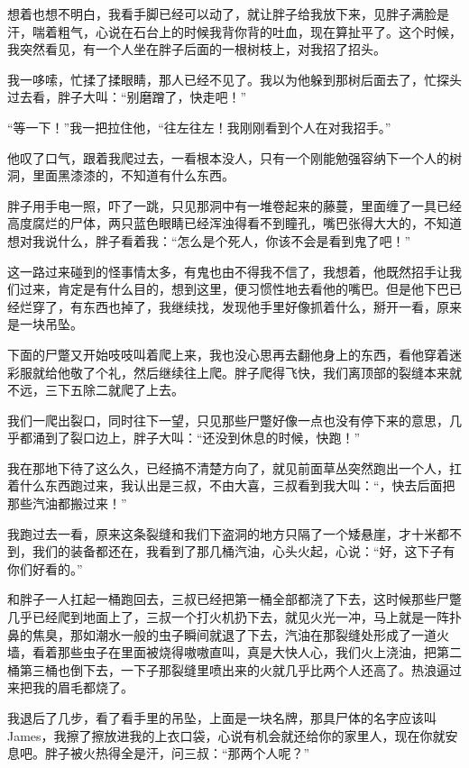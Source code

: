 想着也想不明白，我看手脚已经可以动了，就让胖子给我放下来，见胖子满脸是汗，喘着粗气，心说在石台上的时候我背你背的吐血，现在算扯平了。这个时候，我突然看见，有一个人坐在胖子后面的一根树枝上，对我招了招头。

我一哆嗦，忙揉了揉眼睛，那人已经不见了。我以为他躲到那树后面去了，忙探头过去看，胖子大叫：“别磨蹭了，快走吧！”

“等一下！”我一把拉住他，“往左往左！我刚刚看到个人在对我招手。”

他叹了口气，跟着我爬过去，一看根本没人，只有一个刚能勉强容纳下一个人的树洞，里面黑漆漆的，不知道有什么东西。

胖子用手电一照，吓了一跳，只见那洞中有一堆卷起来的藤蔓，里面缠了一具已经高度腐烂的尸体，两只蓝色眼睛已经浑浊得看不到瞳孔，嘴巴张得大大的，不知道想对我说什么，胖子看着我：“怎么是个死人，你该不会是看到鬼了吧！”

这一路过来碰到的怪事情太多，有鬼也由不得我不信了，我想着，他既然招手让我们过来，肯定是有什么目的，想到这里，便习惯性地去看他的嘴巴。但是他下巴已经烂穿了，有东西也掉了，我继续找，发现他手里好像抓着什么，掰开一看，原来是一块吊坠。

下面的尸蹩又开始吱吱叫着爬上来，我也没心思再去翻他身上的东西，看他穿着迷彩服就给他敬了个礼，然后继续往上爬。胖子爬得飞快，我们离顶部的裂缝本来就不远，三下五除二就爬了上去。

我们一爬出裂口，同时往下一望，只见那些尸蹩好像一点也没有停下来的意思，几乎都涌到了裂口边上，胖子大叫：“还没到休息的时候，快跑！”

我在那地下待了这么久，已经搞不清楚方向了，就见前面草丛突然跑出一个人，扛着什么东西跑过来，我认出是三叔，不由大喜，三叔看到我大叫：“，快去后面把那些汽油都搬过来！”

我跑过去一看，原来这条裂缝和我们下盗洞的地方只隔了一个矮悬崖，才十米都不到，我们的装备都还在，我看到了那几桶汽油，心头火起，心说：“好，这下子有你们好看的。”

和胖子一人扛起一桶跑回去，三叔已经把第一桶全部都浇了下去，这时候那些尸蹩几乎已经爬到地面上了，三叔一个打火机扔下去，就见火光一冲，马上就是一阵扑鼻的焦臭，那如潮水一般的虫子瞬间就退了下去，汽油在那裂缝处形成了一道火墙，看着那些虫子在里面被烧得嗷嗷直叫，真是大快人心，我们火上浇油，把第二桶第三桶也倒下去，一下子那裂缝里喷出来的火就几乎比两个人还高了。热浪逼过来把我的眉毛都烧了。

我退后了几步，看了看手里的吊坠，上面是一块名牌，那具尸体的名字应该叫James，我擦了擦放进我的上衣口袋，心说有机会就还给你的家里人，现在你就安息吧。胖子被火热得全是汗，问三叔：“那两个人呢？”


